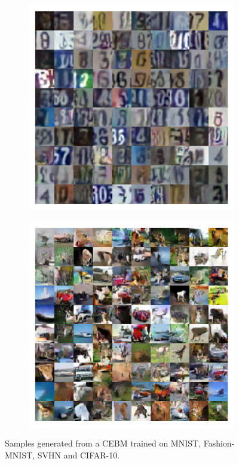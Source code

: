 \documentclass{article}
\begin{document}
\begin{figure}[!t]
\begin{subfigure}{0.22\textwidth}
\end{subfigure}
\begin{subfigure}{0.22\textwidth}
\centering
\includegraphics[width=\textwidth]{figures/svhn_cebm_buffer_samples3.pdf}
\end{subfigure} %
\begin{subfigure}{0.22\textwidth}
\centering
\includegraphics[width=\textwidth]{figures/cifar10_cebm_buffer_samples.pdf}
\end{subfigure}
\caption{Samples generated from a CEBM trained on MNIST, Fashion-MNIST, SVHN and CIFAR-10.}
\label{fig:generated-samples}
\end{figure}
\end{document}
